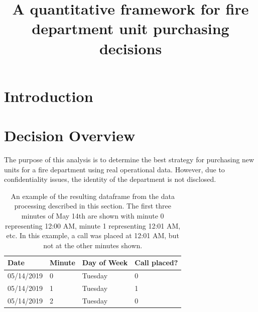 \documentclass[article]{proc}
\begin{document}
\title{A quantitative framework for fire department unit purchasing decisions}
\address[1]{The University of Texas at Austin, Austin, TX, 78712, USA}

\maketitle



\section{Introduction}



\section{Decision Overview}
The purpose of this analysis is to determine the best strategy for purchasing new units for a fire department using real operational data. However, due to confidentiality issues, the identity of the department is not disclosed. 






\begin{table}[h]
\centering
\caption{An example of the resulting dataframe from the data processing described in this section. The first three minutes of May 14th are shown with minute 0 representing 12:00 AM, minute 1 representing 12:01 AM, etc. In this example, a call was placed at 12:01 AM, but not at the other minutes shown.}
\begin{tabular}{|l|l|l|l|}
\hline
\textbf{Date} & \textbf{Minute} & \textbf{Day of Week} & \textbf{Call placed?} \\ \hline
05/14/2019    & 0               & Tuesday              & 0                     \\ \hline
05/14/2019    & 1               & Tuesday              & 1                     \\ \hline
05/14/2019    & 2               & Tuesday              & 0                     \\ \hline
\end{tabular}
\label{minutedf}
\end{table}
\end{document}
